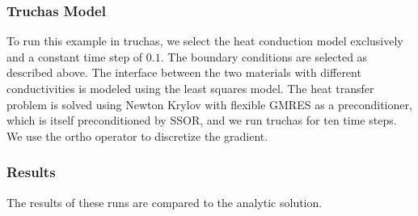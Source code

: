 \documentclass[12pt]{article}
\begin{document}
\subsubsection*{Truchas Model}

To run this example in truchas, we select the heat conduction model
exclusively and a constant time step of $0.1$.
The boundary conditions are selected as described above.
The interface between the two materials with different conductivities
is modeled using the least squares model.
The heat transfer problem is solved using Newton Krylov with flexible
GMRES as a preconditioner, which is itself preconditioned by SSOR, and
we run truchas for ten time steps. We use the ortho operator to
discretize the gradient. 


\subsubsection*{Results}

The results of these runs are compared to the analytic solution.
\end{document}
